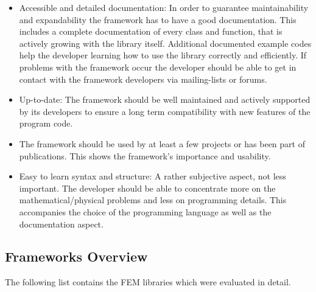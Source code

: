 \begin{itemize}
  \item Accessible and detailed documentation: In order to guarantee maintainability and expandability the framework has to have a good documentation. This includes a complete documentation of every class and function, that is actively growing with the library itself. Additional documented example codes help the developer learning how to use the library correctly and efficiently. If problems with the framework occur the developer should be able to get in contact with the framework developers via mailing-lists or forums.
 
  \item Up-to-date: The framework should be well maintained and actively supported by its developers to ensure a long term compatibility with new features of the program code.
 
  \item The framework should be used by at least a few projects or has been part of publications. This shows the framework's importance and usability.
 
  \item Easy to learn syntax and structure: A rather subjective aspect, not less important. The developer should be able to concentrate more on the mathematical/physical problems and less on programming details. This accompanies the choice of the programming language as well as the documentation aspect.
 \end{itemize}
 
 
 
 \subsection{Frameworks Overview}
 The following list contains the FEM libraries which were evaluated in detail.
  
  
